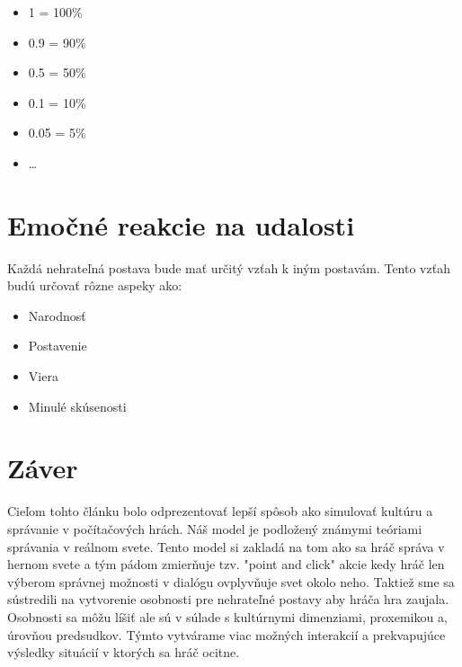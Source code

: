 \documentclass[10pt,twoside,slovak,a4paper]{article}
\begin{document}
\begin{itemize}
	\item 1 = 100\%
	\item 0.9 = 90\%
	\item 0.5 = 50\%
	\item 0.1 = 10\%
	\item 0.05 = 5\%
	\item \dots
\end{itemize}

\pagebreak

\section{Emočné reakcie na udalosti}\label{reakcie}

Každá nehrateľná postava bude mať určitý vzťah k iným postavám. Tento vzťah budú
určovať rôzne aspeky ako:

\begin{itemize}
	\item Narodnosť
	\item Postavenie
	\item Viera
	\item Minulé skúsenosti
\end{itemize}

\pagebreak

\section{Záver}\label{zaver} %

Cieľom tohto článku bolo odprezentovať lepší spôsob ako simulovať kultúru a správanie
v počítačových hrách. Náš model je podložený známymi teóriami správania v reálnom svete.
Tento model si zakladá na tom ako sa hráč správa v hernom svete a tým pádom zmierňuje tzv.
"point and click" akcie kedy hráč len výberom správnej možnosti v dialógu ovplyvňuje svet
okolo neho. Taktiež sme sa sústredili na vytvorenie osobnosti pre nehrateľné postavy aby
hráča hra zaujala. Osobnosti sa môžu líšiť ale sú v súlade s kultúrnymi dimenziami, proxemikou
a, úrovňou predsudkov. Týmto vytvárame viac možných interakcií a prekvapujúce výsledky situácií
v ktorých sa hráč ocitne.

\pagebreak


 
\end{document}
